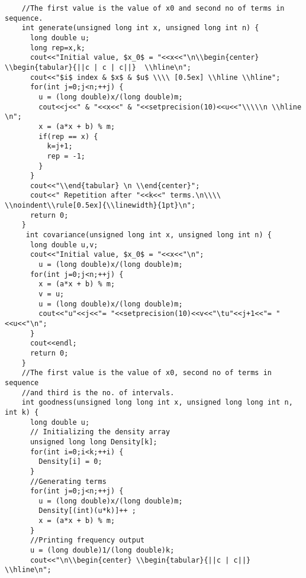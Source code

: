 \documentclass{article}
\begin{document}
\begin{lstlisting}
    //The first value is the value of x0 and second no of terms in sequence.
    int generate(unsigned long int x, unsigned long int n) {
      long double u;
      long rep=x,k;
      cout<<"Initial value, $x_0$ = "<<x<<"\n\\begin{center} \\begin{tabular}{||c | c | c||}  \\hline\n";
      cout<<"$i$ index & $x$ & $u$ \\\\ [0.5ex] \\hline \\hline";
      for(int j=0;j<n;++j) {
        u = (long double)x/(long double)m;
        cout<<j<<" & "<<x<<" & "<<setprecision(10)<<u<<"\\\\\n \\hline \n";
        x = (a*x + b) % m;
        if(rep == x) {
          k=j+1;
          rep = -1;
        }
      }
      cout<<"\\end{tabular} \n \\end{center}";
      cout<<" Repetition after "<<k<<" terms.\n\\\\ \\noindent\\rule[0.5ex]{\\linewidth}{1pt}\n";
      return 0;
    }
     int covariance(unsigned long int x, unsigned long int n) {
      long double u,v;
      cout<<"Initial value, $x_0$ = "<<x<<"\n";
        u = (long double)x/(long double)m;
      for(int j=0;j<n;++j) {
        x = (a*x + b) % m;
        v = u;
        u = (long double)x/(long double)m;
        cout<<"u"<<j<<"= "<<setprecision(10)<<v<<"\tu"<<j+1<<"= "<<u<<"\n";
      }
      cout<<endl;
      return 0;
    }
    //The first value is the value of x0, second no of terms in sequence 
    //and third is the no. of intervals.
    int goodness(unsigned long long int x, unsigned long long int n, int k) {
      long double u;
      // Initializing the density array
      unsigned long long Density[k];
      for(int i=0;i<k;++i) {
        Density[i] = 0;
      }
      //Generating terms
      for(int j=0;j<n;++j) {
        u = (long double)x/(long double)m;
        Density[(int)(u*k)]++ ;
        x = (a*x + b) % m;
      }
      //Printing frequency output
      u = (long double)1/(long double)k;
      cout<<"\n\\begin{center} \\begin{tabular}{||c | c||}  \\hline\n";

\end{lstlisting}
\end{document}

